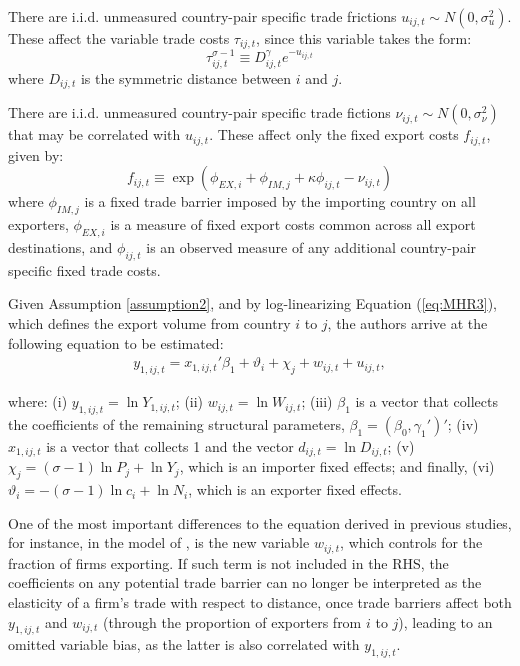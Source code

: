 \begin{assumption} \label{assumption2}
    There are i.i.d. unmeasured country-pair specific trade frictions $u_{ij,t} \sim N(0, \sigma_u^2)$. These affect the variable trade costs $\tau_{ij,t}$, since this variable takes the form:
    $$ \tau_{i j,t}^{\sigma-1} \equiv D_{i j,t}^{\gamma} e^{-u_{i j,t}} $$
    where $D_{ij,t}$ is the symmetric distance between $i$ and $j$. 
\end{assumption}

\begin{assumption} \label{assumption3}
    There are i.i.d. unmeasured country-pair specific trade fictions $\nu_{ij,t}\sim N(0, \sigma_\nu^2)$ that may be correlated with $u_{ij,t}$. These affect only the fixed export costs $f_{ij,t}$, given by:
    $$f_{i j,t} \equiv \exp \left(\phi_{E X, i}+\phi_{I M, j}+\kappa \phi_{i j,t}-\nu_{i j,t}\right)$$
    where $\phi_{I M, j}$ is a fixed trade barrier imposed by the importing country on all exporters, $\phi_{E X, i}$ is a measure of fixed export costs common across all export destinations, and $\phi_{i j,t}$ is an observed measure of any additional country-pair specific fixed trade costs.
\end{assumption}

Given Assumption \ref{assumption2}, and by log-linearizing Equation (\ref{eq:MHR3}), which defines the export volume from country $i$ to $j$, the authors arrive at the following equation to be estimated:
\begin{align}
    y_{1,ij,t} = x_{1,ij,t}'\beta_1 + \vartheta_i + \chi_j + w_{ij,t} + u_{ij,t},
    \label{eq:est_MHR_wage}
\end{align}

\noindent where: (i) $y_{1,ij,t} = \ln Y_{1,ij,t}$; (ii) $w_{ij,t} = \ln W_{ij,t}$; (iii) $\beta_1$ is a vector that collects the coefficients of the remaining structural parameters, $\beta_1 = (\beta_0, \gamma_1')'$; (iv) $x_{1,ij,t}$ is a vector that collects 1 and the vector $ d_{ij,t} = \ln D_{ij,t}$; (v) $\chi_j = (\sigma -1) \ln P_j + \ln Y_j$, which is an importer fixed effects; and finally, (vi) $\vartheta_i = -(\sigma - 1) \ln c_i + \ln N_i$, which is an exporter fixed effects.

One of the most important differences to the equation derived in previous studies, for instance, in the model of \cite{anderson2003gravity}, is the new variable $w_{ij,t}$, which controls for the fraction of firms exporting. If such term is not included in the RHS, the coefficients on any potential trade barrier can no longer be interpreted as the elasticity of a firm's trade with respect to distance, once trade barriers affect both $y_{1,ij,t}$ and $w_{ij,t}$ (through the proportion of exporters from $i$ to $j$), leading to an omitted variable bias, as the latter is also correlated with $y_{1,ij,t}$.

